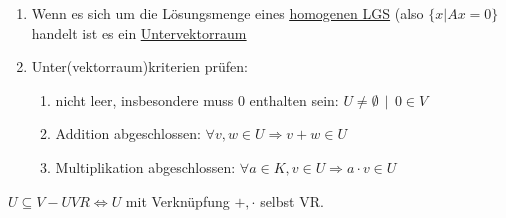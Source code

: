 \documentclass{scrartcl}
\newcommand{\linkTo}[1]{\hyperref[#1]{\underline{#1}}}
\newcommand{\linkToRef}[2][ref]{\hyperref[#1]{\underline{#2}}}
\begin{document}
\begin{enumerate}
\item Wenn es sich um die Lösungsmenge eines \linkToRef[homogenes LGS]{homogenen LGS} (also  $\{x|Ax=0\}$ handelt ist es ein \linkTo{Untervektorraum}
\item Unter(vektorraum)kriterien prüfen: 
        \begin{enumerate}[label={(\arabic*)}]
		\item %
		nicht leer, insbesondere muss 0 enthalten sein: $U \neq \emptyset ~~|~~ 0 \in V$ 
		
		\item %
		Addition abgeschlossen: $\forall v,w \in U \Rightarrow v + w \in U$ 
		
		\item %
		Multiplikation abgeschlossen: $\forall a \in K, v \in U \Rightarrow a \cdot v \in U$
	\end{enumerate}
\end{enumerate}

\begin{Notiz}
$U \subseteq V-UVR \Leftrightarrow U$ mit Verknüpfung $+,\cdot$ selbst VR.
\end{Notiz}
\end{document}
